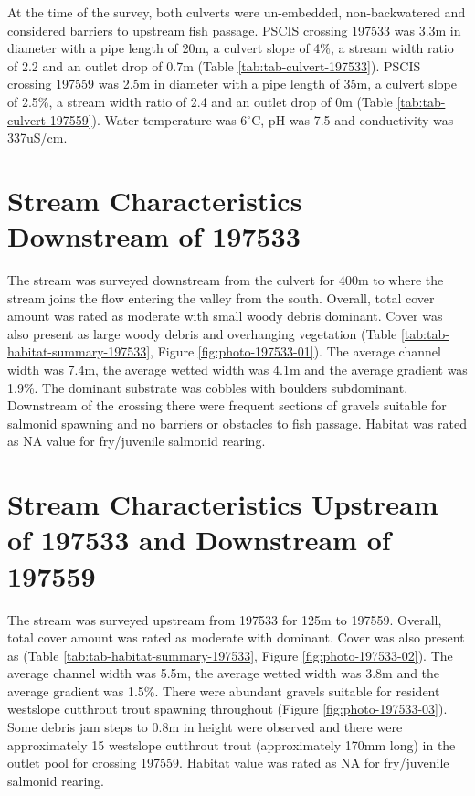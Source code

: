 \documentclass[
]{book}
\begin{document}
At the time of the survey, both culverts were un-embedded, non-backwatered and considered barriers to upstream fish passage. PSCIS crossing 197533 was 3.3m in diameter with a pipe length of 20m, a culvert slope of 4\%, a stream width ratio of 2.2 and an outlet drop of 0.7m (Table \ref{tab:tab-culvert-197533}). PSCIS crossing 197559 was 2.5m in diameter with a pipe length of 35m, a culvert slope of 2.5\%, a stream width ratio of 2.4 and an outlet drop of 0m (Table \ref{tab:tab-culvert-197559}). Water temperature was 6\(^\circ\)C, pH was 7.5 and conductivity was 337uS/cm.

\hypertarget{stream-characteristics-downstream-of-197533}{%
\section*{Stream Characteristics Downstream of 197533}\label{stream-characteristics-downstream-of-197533}}

The stream was surveyed downstream from the culvert for 400m to where the stream joins the flow entering the valley from the south. Overall, total cover amount was rated as moderate with small woody debris dominant. Cover was also present as large woody debris and overhanging vegetation (Table \ref{tab:tab-habitat-summary-197533}, Figure \ref{fig:photo-197533-01}). The average channel width was 7.4m, the average wetted width was 4.1m and the average gradient was 1.9\%. The dominant substrate was cobbles with boulders subdominant. Downstream of the crossing there were frequent sections of gravels suitable for salmonid spawning and no barriers or obstacles to fish passage. Habitat was rated as NA value for fry/juvenile salmonid rearing.

\hypertarget{stream-characteristics-upstream-of-197533-and-downstream-of-197559}{%
\section*{Stream Characteristics Upstream of 197533 and Downstream of 197559}\label{stream-characteristics-upstream-of-197533-and-downstream-of-197559}}

The stream was surveyed upstream from 197533 for 125m to 197559. Overall, total cover amount was rated as moderate with dominant. Cover was also present as (Table \ref{tab:tab-habitat-summary-197533}, Figure \ref{fig:photo-197533-02}). The average channel width was 5.5m, the average wetted width was 3.8m and the average gradient was 1.5\%. There were abundant gravels suitable for resident westslope cutthrout trout spawning throughout (Figure \ref{fig:photo-197533-03}). Some debris jam steps to 0.8m in height were observed and there were approximately 15 westslope cutthrout trout (approximately 170mm long) in the outlet pool for crossing 197559. Habitat value was rated as NA for fry/juvenile salmonid rearing.
\end{document}

